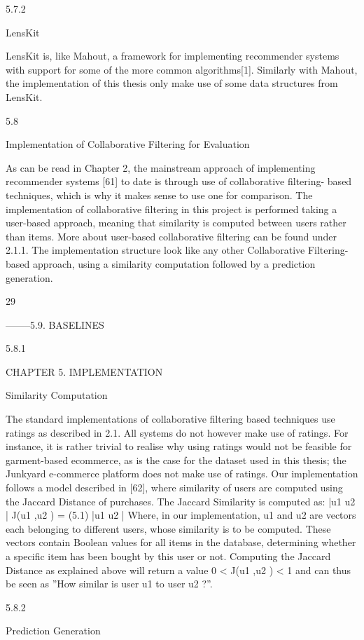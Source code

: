 5.7.2

LensKit

LensKit is, like Mahout, a framework for implementing recommender systems with support for some of the more common algorithms[1]. Similarly with Mahout, the implementation of this thesis only make use of some data structures from LensKit.

5.8

Implementation of Collaborative Filtering for Evaluation

As can be read in Chapter 2, the mainstream approach of implementing recommender
systems [61] to date is through use of collaborative filtering- based techniques, which
is why it makes sense to use one for comparison. The implementation of collaborative
filtering in this project is performed taking a user-based approach, meaning that similarity is computed between users rather than items. More about user-based collaborative
filtering can be found under 2.1.1. The implementation structure look like any other
Collaborative Filtering-based approach, using a similarity computation followed by a
prediction generation.

29

--------5.9. BASELINES

5.8.1

CHAPTER 5. IMPLEMENTATION

Similarity Computation

The standard implementations of collaborative filtering based techniques use ratings as
described in 2.1. All systems do not however make use of ratings. For instance, it is
rather trivial to realise why using ratings would not be feasible for garment-based ecommerce, as is the case for the dataset used in this thesis; the Junkyard e-commerce
platform does not make use of ratings.
Our implementation follows a model described in [62], where similarity of users are
computed using the Jaccard Distance of purchases. The Jaccard Similarity is computed
as:
|u1  u2 |
J(u1 ,u2 ) =
(5.1)
|u1  u2 |
Where, in our implementation, u1 and u2 are vectors each belonging to different users,
whose similarity is to be computed. These vectors contain Boolean values for all items in
the database, determining whether a specific item has been bought by this user or not.
Computing the Jaccard Distance as explained above will return a value 0 < J(u1 ,u2 ) < 1
and can thus be seen as ”How similar is user u1 to user u2 ?”.

5.8.2

Prediction Generation

